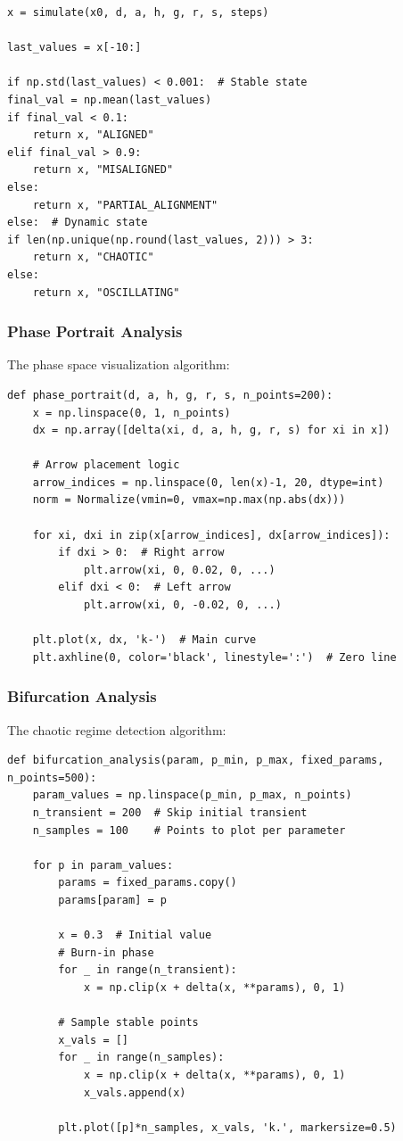 \documentclass[a4paper, 10pt]{article}
\begin{document}
\begin{verbatim}
x = simulate(x0, d, a, h, g, r, s, steps)

last_values = x[-10:]

if np.std(last_values) < 0.001:  # Stable state
final_val = np.mean(last_values)
if final_val < 0.1:
    return x, "ALIGNED"
elif final_val > 0.9:
    return x, "MISALIGNED"
else:
    return x, "PARTIAL_ALIGNMENT"
else:  # Dynamic state
if len(np.unique(np.round(last_values, 2))) > 3:
    return x, "CHAOTIC"
else:
    return x, "OSCILLATING"
\end{verbatim}
\vspace{-3em}

\subsubsection{Phase Portrait Analysis}
The phase space visualization algorithm:

\begin{verbatim}
def phase_portrait(d, a, h, g, r, s, n_points=200):
    x = np.linspace(0, 1, n_points)
    dx = np.array([delta(xi, d, a, h, g, r, s) for xi in x])
    
    # Arrow placement logic
    arrow_indices = np.linspace(0, len(x)-1, 20, dtype=int)
    norm = Normalize(vmin=0, vmax=np.max(np.abs(dx)))
    
    for xi, dxi in zip(x[arrow_indices], dx[arrow_indices]):
        if dxi > 0:  # Right arrow
            plt.arrow(xi, 0, 0.02, 0, ...)
        elif dxi < 0:  # Left arrow
            plt.arrow(xi, 0, -0.02, 0, ...)
    
    plt.plot(x, dx, 'k-')  # Main curve
    plt.axhline(0, color='black', linestyle=':')  # Zero line
\end{verbatim}
\vspace{-3em}

\subsubsection{Bifurcation Analysis}
The chaotic regime detection algorithm:

\begin{verbatim}
def bifurcation_analysis(param, p_min, p_max, fixed_params, n_points=500):
    param_values = np.linspace(p_min, p_max, n_points)
    n_transient = 200  # Skip initial transient
    n_samples = 100    # Points to plot per parameter
    
    for p in param_values:
        params = fixed_params.copy()
        params[param] = p
        
        x = 0.3  # Initial value
        # Burn-in phase
        for _ in range(n_transient):
            x = np.clip(x + delta(x, **params), 0, 1)
        
        # Sample stable points
        x_vals = []
        for _ in range(n_samples):
            x = np.clip(x + delta(x, **params), 0, 1)
            x_vals.append(x)
        
        plt.plot([p]*n_samples, x_vals, 'k.', markersize=0.5)
\end{verbatim}
\vspace{-3em}
\end{document}
